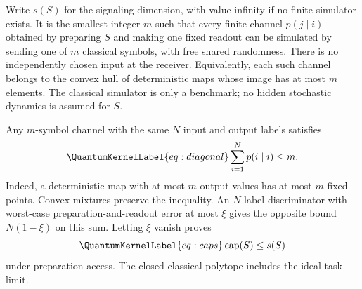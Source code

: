 \documentclass[a4paper,11pt,twocolumn,unpublished]{quantumarticle}
\let\label\QuantumKernelLabel
\DeclareMathOperator{\capn}{cap}
\begin{document}
Write $s(S)$ for the signaling dimension, with value infinity if no finite simulator exists. It is the smallest integer $m$ such that every finite channel $p(j\mid i)$ obtained by preparing $S$ and making one fixed readout can be simulated by sending one of $m$ classical symbols, with free shared randomness. There is no independently chosen input at the receiver. Equivalently, each such channel belongs to the convex hull of deterministic maps whose image has at most $m$ elements. The classical simulator is only a benchmark; no hidden stochastic dynamics is assumed for $S$.

Any $m$-symbol channel with the same $N$ input and output labels satisfies
\begin{equation}\label{eq:diagonal}
 \sum_{i=1}^N p(i\mid i)\leq m.
\end{equation}
Indeed, a deterministic map with at most $m$ output values has at most $m$ fixed points. Convex mixtures preserve the inequality. An $N$-label discriminator with worst-case preparation-and-readout error at most $\xi$ gives the opposite bound $N(1-\xi)$ on this sum. Letting $\xi$ vanish proves
\begin{equation}\label{eq:caps}
 \capn(S)\leq s(S)
\end{equation}
under preparation access. The closed classical polytope includes the ideal task limit.
\end{document}
